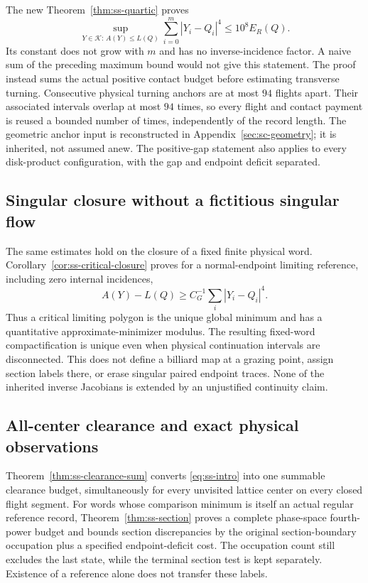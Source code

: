\documentclass[11pt,reqno]{amsart}
\numberwithin{equation}{section}
\theoremstyle{definition}\newtheorem{definition}[theorem]{Definition}
\theoremstyle{remark}\newtheorem{remark}[theorem]{Remark}
\begin{document}
The new Theorem~\ref{thm:ss-quartic} proves
\begin{equation}\label{eq:ss-intro}
 \sup_{Y\in\mathcal K:\,A(Y)\le L(Q)}
 \sum_{i=0}^m|Y_i-Q_i|^4\le10^8 E_R(Q).
\end{equation}
Its constant does not grow with $m$ and has no inverse-incidence
factor. A naive sum of the preceding maximum bound would not give
this statement. The proof instead sums the actual positive contact
budget before estimating transverse turning. Consecutive physical
turning anchors are at most $94$ flights apart. Their associated
intervals overlap at most $94$ times, so every flight and contact
payment is reused a bounded number of times, independently of the
record length. The geometric anchor input is reconstructed in
Appendix~\ref{sec:sc-geometry}; it is inherited, not assumed anew.
The positive-gap statement also applies to every disk-product
configuration, with the gap and endpoint deficit separated.

\subsection*{Singular closure without a fictitious singular flow}
The same estimates hold on the closure of a fixed finite physical
word. Corollary~\ref{cor:ss-critical-closure} proves for a normal-endpoint
limiting reference, including zero internal incidences,
\[
 A(Y)-L(Q)\ge C_G^{-1}\sum_i|Y_i-Q_i|^4.
\]
Thus a critical limiting polygon is the unique global minimum and has
a quantitative approximate-minimizer modulus. The resulting
fixed-word compactification is unique even when physical continuation
intervals are disconnected. This does not define a billiard map at a
grazing point, assign section labels there, or erase singular paired
endpoint traces. None of the inherited inverse Jacobians is extended
by an unjustified continuity claim.

\subsection*{All-center clearance and exact physical observations}
Theorem~\ref{thm:ss-clearance-sum} converts \eqref{eq:ss-intro} into
one summable clearance budget, simultaneously for every unvisited
lattice center on every closed flight segment. For words whose
comparison minimum is itself an actual regular reference record,
Theorem~\ref{thm:ss-section} proves a complete phase-space fourth-power
budget and bounds section discrepancies by the original
section-boundary occupation plus a specified endpoint-deficit cost.
The occupation count still excludes the last state, while the
terminal section test is kept separately. Existence of a reference
alone does not transfer these labels.
\end{document}
